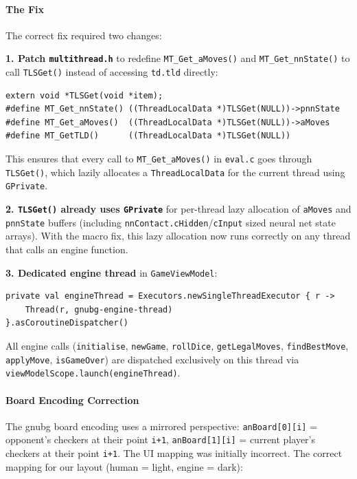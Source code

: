 \documentclass[11pt,a4paper]{article}
\begin{document}
\paragraph{The Fix}\label{tls-fix}

The correct fix required two changes:

\textbf{1. Patch \texttt{multithread.h}} to redefine
\texttt{MT\_Get\_aMoves()} and \texttt{MT\_Get\_nnState()} to call
\texttt{TLSGet()} instead of accessing \texttt{td.tld} directly:

\begin{verbatim}
extern void *TLSGet(void *item);
#define MT_Get_nnState() ((ThreadLocalData *)TLSGet(NULL))->pnnState
#define MT_Get_aMoves()  ((ThreadLocalData *)TLSGet(NULL))->aMoves
#define MT_GetTLD()      ((ThreadLocalData *)TLSGet(NULL))
\end{verbatim}

This ensures that every call to \texttt{MT\_Get\_aMoves()} in
\texttt{eval.c} goes through \texttt{TLSGet()}, which lazily allocates
a \texttt{ThreadLocalData} for the current thread using \texttt{GPrivate}.

\textbf{2. \texttt{TLSGet()} already uses \texttt{GPrivate}} for
per-thread lazy allocation of \texttt{aMoves} and \texttt{pnnState}
buffers (including \texttt{nnContact.cHidden}/\texttt{cInput} sized
neural net state arrays). With the macro fix, this lazy allocation now
runs correctly on any thread that calls an engine function.

\textbf{3. Dedicated engine thread} in \texttt{GameViewModel}:

\begin{verbatim}
private val engineThread = Executors.newSingleThreadExecutor { r ->
    Thread(r, gnubg-engine-thread)
}.asCoroutineDispatcher()
\end{verbatim}

All engine calls (\texttt{initialise}, \texttt{newGame},
\texttt{rollDice}, \texttt{getLegalMoves}, \texttt{findBestMove},
\texttt{applyMove}, \texttt{isGameOver}) are dispatched exclusively on
this thread via \texttt{viewModelScope.launch(engineThread)}.

\paragraph{Board Encoding Correction}\label{board-encoding-v093}

The gnubg board encoding uses a mirrored perspective:
\texttt{anBoard[0][i]} = opponent's checkers at their point \texttt{i+1},
\texttt{anBoard[1][i]} = current player's checkers at their point
\texttt{i+1}. The UI mapping was initially incorrect. The correct
mapping for our layout (human = light, engine = dark):
\end{document}
